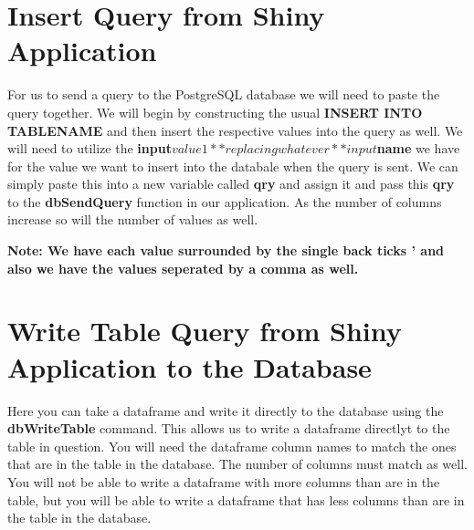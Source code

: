 \documentclass[]{book}
\newenvironment{Shaded}{\begin{snugshade}}{\end{snugshade}}
\newcommand{\KeywordTok}[1]{\textcolor[rgb]{0.13,0.29,0.53}{\textbf{#1}}}
\newcommand{\DataTypeTok}[1]{\textcolor[rgb]{0.13,0.29,0.53}{#1}}
\newcommand{\StringTok}[1]{\textcolor[rgb]{0.31,0.60,0.02}{#1}}
\newcommand{\OperatorTok}[1]{\textcolor[rgb]{0.81,0.36,0.00}{\textbf{#1}}}
\newcommand{\NormalTok}[1]{#1}
\begin{document}
\section{Insert Query from Shiny
Application}\label{insert-query-from-shiny-application}

For us to send a query to the PostgreSQL database we will need to paste
the query together. We will begin by constructing the usual
\textbf{INSERT INTO TABLENAME} and then insert the respective values
into the query as well. We will need to utilize the
\textbf{input\(value1** replacing whatever **input\)name} we have for
the value we want to insert into the databale when the query is sent. We
can simply paste this into a new variable called \textbf{qry} and assign
it and pass this \textbf{qry} to the \textbf{dbSendQuery} function in
our application. As the number of columns increase so will the number of
values as well.

\begin{Shaded}
\end{Shaded}

\textbf{Note: We have each value surrounded by the single back ticks '
and also we have the values seperated by a comma as well.}

\section{Write Table Query from Shiny Application to the
Database}\label{write-table-query-from-shiny-application-to-the-database}

Here you can take a dataframe and write it directly to the database
using the \textbf{dbWriteTable} command. This allows us to write a
dataframe directlyt to the table in question. You will need the
dataframe column names to match the ones that are in the table in the
database. The number of columns must match as well. You will not be able
to write a dataframe with more columns than are in the table, but you
will be able to write a dataframe that has less columns than are in the
table in the database.
\end{document}
